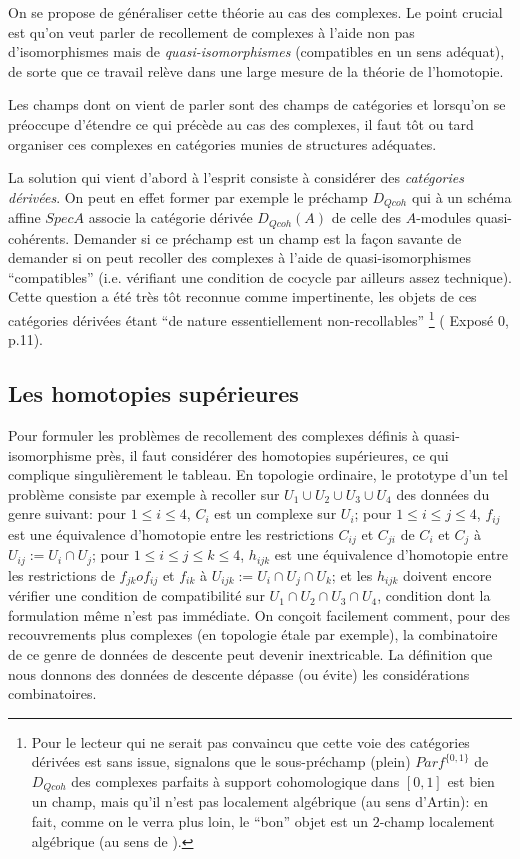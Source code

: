 \documentclass[12pt]{article}
\newcommand{\subnumero}[1]{\subsection*{#1}\phantomsection\addcontentsline{toc}{subsection}{#1}}
\begin{document}
On se propose de g\'en\'eraliser cette th\'eorie au cas des complexes.
Le point crucial est qu'on veut parler de recollement de complexes
\`a l'aide non pas d'isomorphismes mais de {\em quasi-isomorphismes}
(compatibles en un sens ad\'equat), de sorte que ce travail rel\`eve
dans une large mesure de la th\'eorie de l'homotopie.

Les champs dont on vient de parler sont des champs de cat\'egories
et lorsqu'on se pr\'eoccupe d'\'etendre ce qui pr\'ec\`ede au cas des
complexes, il faut t\^ot ou tard organiser ces complexes en cat\'egories
munies de structures ad\'equates.

La solution qui vient d'abord \`a l'esprit consiste \`a consid\'erer
des {\em cat\'egories d\'eriv\'ees}. On peut en effet former par exemple le
pr\'echamp $D_{Qcoh}$ qui \`a un sch\'ema affine $Spec A$ associe
la cat\'egorie d\'eriv\'ee $D_{Qcoh}(A)$ de celle des $A$-modules
quasi-coh\'erents. Demander si ce pr\'echamp est un champ
est la fa\c{c}on savante
de demander si on peut recoller des complexes \`a l'aide de quasi-isomorphismes
``compatibles'' (i.e. v\'erifiant une condition de cocycle par ailleurs
assez technique). Cette question a \'et\'e tr\`es t\^ot reconnue comme
impertinente, les objets de ces cat\'egories d\'eriv\'ees \'etant
``de nature essentiellement non-recollables'' \footnote{
Pour le lecteur qui ne serait pas convaincu que cette voie des
cat\'egories d\'eriv\'ees est sans issue, signalons que
le sous-pr\'echamp (plein) $Parf^{\{0,1\}}$ de $D_{Qcoh}$
des complexes parfaits \`a support cohomologique dans $[0,1]$ est bien
un champ, mais qu'il n'est pas localement alg\'ebrique (au sens d'Artin):
en fait, comme on le verra plus loin, le ``bon'' objet est un $2$-champ
localement alg\'ebrique (au sens de \cite{geometricN}).}
(\cite {SGA6} Expos\'e 0, p.11).

\subnumero{Les homotopies sup\'erieures}

Pour formuler les probl\`emes de recollement des complexes
d\'efinis \`a quasi-isomorphisme pr\`es,
il faut consid\'erer des homotopies sup\'erieures, ce qui
complique singuli\`erement le tableau. En topologie ordinaire,
le prototype d'un tel probl\`eme consiste par exemple \`a recoller sur
$U_1 \cup U_2 \cup U_3 \cup U_4$ des donn\'ees
du genre suivant: pour $1 \leq i\leq 4$, $C_i$ est un complexe sur $U_i$;
pour $1 \leq i\leq j \leq 4$, $f_{ij}$ est une \'equivalence d'homotopie
entre les restrictions $C_{ij}$ et $C_{ji}$
de $C_i$ et $C_j$ \`a $U_{ij}:=U_i \cap U_j$;
pour $1 \leq i\leq j \leq k\leq 4$, $h_{ijk}$ est une \'equivalence d'homotopie
entre les restrictions de $f_{jk}o f_{ij}$ et $f_{ik}$ \`a
$U_{ijk}:=U_i \cap U_j \cap U_k$; et les $h_{ijk}$ doivent encore v\'erifier
une condition de compatibilit\'e sur $U_1 \cap U_2 \cap U_3 \cap U_4$,
condition dont la formulation m\^eme n'est pas imm\'ediate. On con\c{c}oit
facilement
comment, pour des recouvrements plus complexes (en topologie \'etale par
exemple),
la combinatoire de ce genre de donn\'ees de descente peut devenir inextricable.
La d\'efinition que nous donnons des donn\'ees de descente d\'epasse (ou
\'evite)
les consid\'erations combinatoires.
\end{document}
